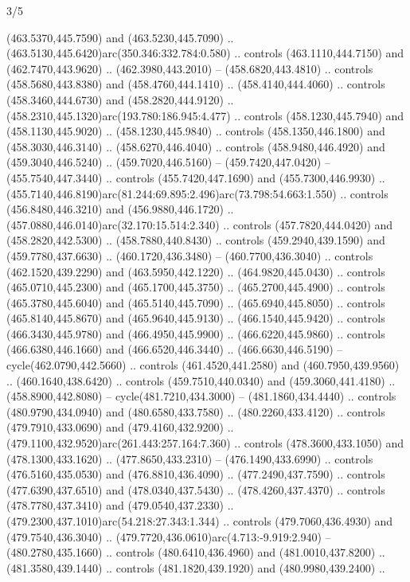 \begin{flagdescription}{3/5}
\begin{scope}[shift={(0.5\flaglength,0.5\flagwidth)},scale=\flagwidth/510]
\begin{scope}[y=0.80pt, x=0.80pt, yscale=-1.06, xscale=1.06,yshift=-240pt,xshift=-400pt]
\begin{scope}[cm={{0.83333,0.0,0.0,0.83333,(154.64672,48.64761)}}]
\begin{scope}[cm={{0.93334,0.0,0.0,0.93334,(-4.86471,22.64035)}}]
\begin{scope}[draw=black]
  (463.5370,445.7590) and (463.5230,445.7090) ..
  (463.5130,445.6420)arc(350.346:332.784:0.580) .. controls (463.1110,444.7150)
  and (462.7470,443.9620) .. (462.3980,443.2010) -- (458.6820,443.4810) ..
  controls (458.5680,443.8380) and (458.4760,444.1410) .. (458.4140,444.4060) ..
  controls (458.3460,444.6730) and (458.2820,444.9120) ..
  (458.2310,445.1320)arc(193.780:186.945:4.477) .. controls (458.1230,445.7940)
  and (458.1130,445.9020) .. (458.1230,445.9840) .. controls (458.1350,446.1800)
  and (458.3030,446.3140) .. (458.6270,446.4040) .. controls (458.9480,446.4920)
  and (459.3040,446.5240) .. (459.7020,446.5160) -- (459.7420,447.0420) --
  (455.7540,447.3440) .. controls (455.7420,447.1690) and (455.7300,446.9930) ..
  (455.7140,446.8190)arc(81.244:69.895:2.496)arc(73.798:54.663:1.550) ..
  controls (456.8480,446.3210) and (456.9880,446.1720) ..
  (457.0880,446.0140)arc(32.170:15.514:2.340) .. controls (457.7820,444.0420)
  and (458.2820,442.5300) .. (458.7880,440.8430) .. controls (459.2940,439.1590)
  and (459.7780,437.6630) .. (460.1720,436.3480) -- (460.7700,436.3040) ..
  controls (462.1520,439.2290) and (463.5950,442.1220) .. (464.9820,445.0430) ..
  controls (465.0710,445.2300) and (465.1700,445.3750) .. (465.2700,445.4900) ..
  controls (465.3780,445.6040) and (465.5140,445.7090) .. (465.6940,445.8050) ..
  controls (465.8140,445.8670) and (465.9640,445.9130) .. (466.1540,445.9420) ..
  controls (466.3430,445.9780) and (466.4950,445.9900) .. (466.6220,445.9860) ..
  controls (466.6380,446.1660) and (466.6520,446.3440) .. (466.6630,446.5190) --
  cycle(462.0790,442.5660) .. controls (461.4520,441.2580) and
  (460.7950,439.9560) .. (460.1640,438.6420) .. controls (459.7510,440.0340) and
  (459.3060,441.4180) .. (458.8900,442.8080) -- cycle(481.7210,434.3000) --
  (481.1860,434.4440) .. controls (480.9790,434.0940) and (480.6580,433.7580) ..
  (480.2260,433.4120) .. controls (479.7910,433.0690) and (479.4160,432.9200) ..
  (479.1100,432.9520)arc(261.443:257.164:7.360) .. controls (478.3600,433.1050)
  and (478.1300,433.1620) .. (477.8650,433.2310) -- (476.1490,433.6990) ..
  controls (476.5160,435.0530) and (476.8810,436.4090) .. (477.2490,437.7590) ..
  controls (477.6390,437.6510) and (478.0340,437.5430) .. (478.4260,437.4370) ..
  controls (478.7780,437.3410) and (479.0540,437.2330) ..
  (479.2300,437.1010)arc(54.218:27.343:1.344) .. controls (479.7060,436.4930)
  and (479.7540,436.3040) .. (479.7720,436.0610)arc(4.713:-9.919:2.940) --
  (480.2780,435.1660) .. controls (480.6410,436.4960) and (481.0010,437.8200) ..
  (481.3580,439.1440) .. controls (481.1820,439.1920) and (480.9980,439.2400) ..

\end{scope}
\end{scope}
\end{scope}
\end{scope}
\end{scope}
\end{flagdescription}

